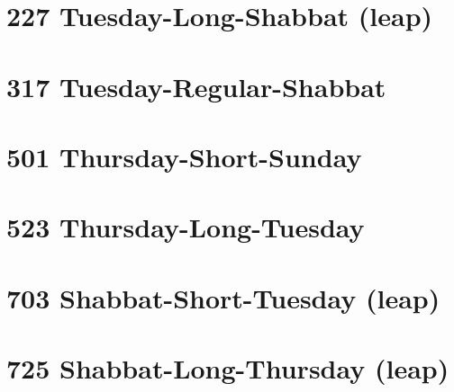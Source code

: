 \section{227 Tuesday-Long-Shabbat (leap)}
\label{227}
\tishreiTues

\section{317 Tuesday-Regular-Shabbat}
\label{317}
\tishreiTues

\section{501 Thursday-Short-Sunday}
\label{501}
\tishreiThurs

\section{523 Thursday-Long-Tuesday}
\label{523}
\tishreiThurs


\section{703 Shabbat-Short-Tuesday (leap)}
\label{703}
\tishreiShab
{}
\kislevTues

\section{725 Shabbat-Long-Thursday (leap)}
\label{725}
\tishreiShab
{}